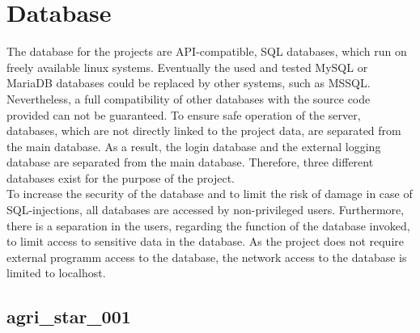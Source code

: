 
\section{Database}

The database for the projects are API-compatible, SQL databases, which run on freely available linux systems. Eventually the used and tested MySQL or MariaDB databases could be 
replaced by other systems, such as MSSQL. Nevertheless, a full compatibility of other databases with the source code provided can not be guaranteed. To ensure safe operation of the
server, databases, which are not directly linked to the project data, are separated from the main database. As a result, the login database and the external logging database are 
separated from the main database. Therefore, three different databases exist for the purpose of the project.\\ 
To increase the security of the database and to limit the risk of damage in case of SQL-injections, all databases are accessed by non-privileged users. Furthermore, there is a 
separation in the users, regarding the function of the database invoked, to limit access to sensitive data in the database. As the project does not require external programm access 
to the database, the network access to the database is limited to localhost.

\subsection{agri\_star\_001}

